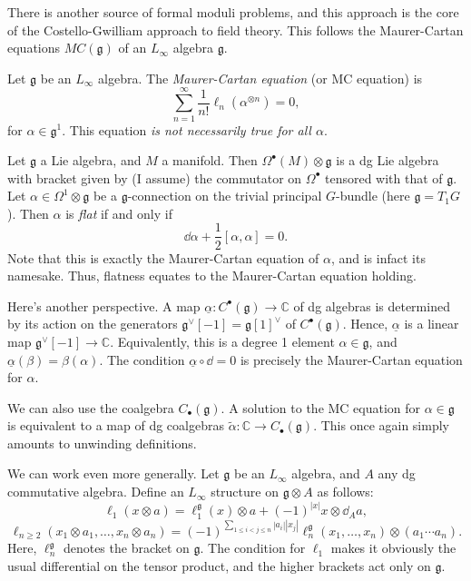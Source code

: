 There is another source of formal moduli problems, and this approach is the core of the Costello-Gwilliam approach to field theory. This follows the Maurer-Cartan equations $MC(\mathfrak{g} )$ of an $L_\infty $ algebra $\mathfrak{g} $.

\begin{definition}\label{dfn:10-2-5}
	Let $\mathfrak{g} $ be an $L_\infty $ algebra. The \emph{Maurer-Cartan equation} (or MC equation) is
	\[
		\sum_{n=1}^{\infty} \frac{1}{n!} \ell _n(\alpha ^{\otimes n} )=0,
	\]
	for $\alpha \in \mathfrak{g} ^1$. This equation \emph{is not necessarily true for all $\alpha $}.
\end{definition}

Let $\mathfrak{g}$ a Lie algebra, and $M$ a manifold. Then $\Omega ^{\bullet} (M)\otimes \mathfrak{g} $ is a dg Lie algebra with bracket given by (I assume) the commutator on $\Omega ^{\bullet} $ tensored with that of $\mathfrak{g} $. Let $\alpha \in \Omega ^1 \otimes \mathfrak{g} $ be a $\mathfrak{g} $-connection on the trivial principal $G$-bundle (here $\mathfrak{g} =T_1G$). Then $\alpha $ is \emph{flat} if and only if
\[
	\dd \alpha +\frac{1}{2} [\alpha ,\alpha ]=0
.\]
Note that this is exactly the Maurer-Cartan equation of $\alpha $, and is infact its namesake. Thus, flatness equates to the Maurer-Cartan equation holding.

Here's another perspective. A map $\underline{\alpha } : C^{\bullet} (\mathfrak{g} ) \to \mathbb{C} $ of dg algebras is determined by its action on the generators $\mathfrak{g}^{\vee }[-1] =\mathfrak{g} [1]^{\vee } $ of $C^{\bullet} (\mathfrak{g} )$. Hence, $\underline{\alpha } $ is a linear map $\mathfrak{g} ^{\vee } [-1]\to \mathbb{C} $. Equivalently, this is a degree 1 element $\alpha \in \mathfrak{g} $, and $\underline{\alpha } (\beta ) = \beta (\alpha )$. The condition $\underline{\alpha } \circ \dd =0 $ is precisely the Maurer-Cartan equation for $\alpha $.

We can also use the coalgebra $C_{\bullet} (\mathfrak{g} )$. A solution to the MC equation for $\alpha \in \mathfrak{g} $ is equivalent to a map of dg coalgebras $\widetilde{\alpha } : \mathbb{C}  \to C_{\bullet} (\mathfrak{g} )$. This once again simply amounts to unwinding definitions.

We can work even more generally. Let $\mathfrak{g} $ be an $L_\infty $ algebra, and $A$ any dg commutative algebra. Define an $L_\infty $ structure on $\mathfrak{g} \otimes A$ as follows:
\[
	\ell_1(x\otimes a) = \ell _1^{\mathfrak{g} } (x)\otimes a + (-1)^{\left| x \right| } x\otimes \dd_Aa,
\]
\[
	\ell_{n\geq 2} (x_1 \otimes a_1, \ldots , x_n \otimes a_n) = (-1)^{\sum_{1\leq i<j\leq n} \left| a_i \right| \left| x_j \right| } \ell _n^{\mathfrak{g} } (x_1, \ldots ,x_n) \otimes (a_1\cdots a_n)
.\]
Here, $\ell _n^{\mathfrak{g} } $ denotes the bracket on $\mathfrak{g} $. The condition for $\ell _1$ makes it obviously the usual differential on the tensor product, and the higher brackets act only on $\mathfrak{g} $.

